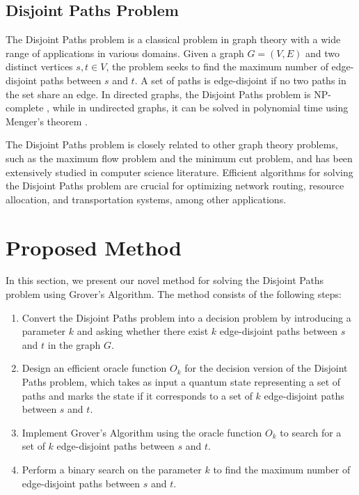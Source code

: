 \subsection{Disjoint Paths Problem}

The Disjoint Paths problem is a classical problem in graph theory with a wide range of applications in various domains. Given a graph $G = (V, E)$ and two distinct vertices $s, t \in V$, the problem seeks to find the maximum number of edge-disjoint paths between $s$ and $t$. A set of paths is edge-disjoint if no two paths in the set share an edge. In directed graphs, the Disjoint Paths problem is NP-complete \cite{karp}, while in undirected graphs, it can be solved in polynomial time using Menger's theorem \cite{menger}.

The Disjoint Paths problem is closely related to other graph theory problems, such as the maximum flow problem and the minimum cut problem, and has been extensively studied in computer science literature. Efficient algorithms for solving the Disjoint Paths problem are crucial for optimizing network routing, resource allocation, and transportation systems, among other applications.

\section{Proposed Method}
\label{sec:method}

In this section, we present our novel method for solving the Disjoint Paths problem using Grover's Algorithm. The method consists of the following steps:

\begin{enumerate}
    \item Convert the Disjoint Paths problem into a decision problem by introducing a parameter $k$ and asking whether there exist $k$ edge-disjoint paths between $s$ and $t$ in the graph $G$.
    \item Design an efficient oracle function $O_k$ for the decision version of the Disjoint Paths problem, which takes as input a quantum state representing a set of paths and marks the state if it corresponds to a set of $k$ edge-disjoint paths between $s$ and $t$.
    \item Implement Grover's Algorithm using the oracle function $O_k$ to search for a set of $k$ edge-disjoint paths between $s$ and $t$.
    \item Perform a binary search on the parameter $k$ to find the maximum number of edge-disjoint paths between $s$ and $t$.
\end{enumerate}

